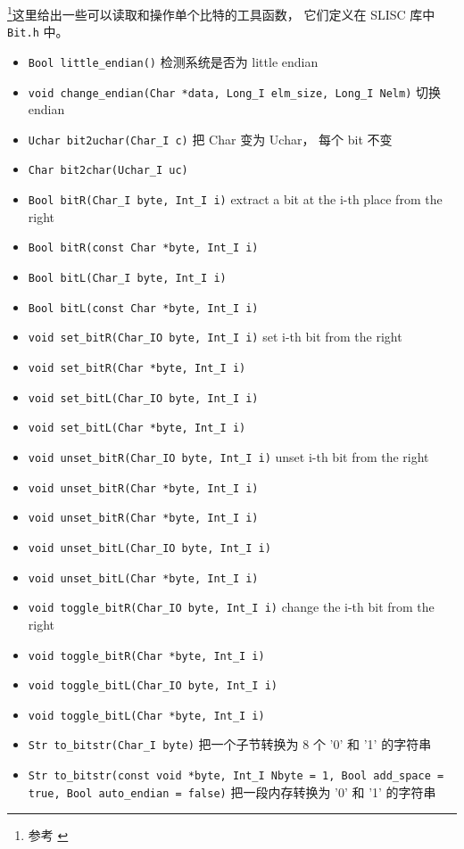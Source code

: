 
\footnote{参考 \cite{NR3}}这里给出一些可以读取和操作单个比特的工具函数， 它们定义在 SLISC 库中 \verb|Bit.h| 中。

\begin{itemize}
\item \verb|Bool little_endian()| 检测系统是否为 little endian
\item \verb|void change_endian(Char *data, Long_I elm_size, Long_I Nelm)| 切换 endian
\item \verb|Uchar bit2uchar(Char_I c)| 把 Char 变为 Uchar， 每个 bit 不变
\item \verb|Char bit2char(Uchar_I uc)|
\item \verb|Bool bitR(Char_I byte, Int_I i)| extract a bit at the i-th place from the right
\item \verb|Bool bitR(const Char *byte, Int_I i)|
\item \verb|Bool bitL(Char_I byte, Int_I i)|
\item \verb|Bool bitL(const Char *byte, Int_I i)|
\item \verb|void set_bitR(Char_IO byte, Int_I i)| set i-th bit from the right
\item \verb|void set_bitR(Char *byte, Int_I i)|
\item \verb|void set_bitL(Char_IO byte, Int_I i)|
\item \verb|void set_bitL(Char *byte, Int_I i)|
\item \verb|void unset_bitR(Char_IO byte, Int_I i)| unset i-th bit from the right
\item \verb|void unset_bitR(Char *byte, Int_I i)|
\item \verb|void unset_bitR(Char *byte, Int_I i)|
\item \verb|void unset_bitL(Char_IO byte, Int_I i)|
\item \verb|void unset_bitL(Char *byte, Int_I i)|
\item \verb|void toggle_bitR(Char_IO byte, Int_I i)| change the i-th bit from the right
\item \verb|void toggle_bitR(Char *byte, Int_I i)|
\item \verb|void toggle_bitL(Char_IO byte, Int_I i)|
\item \verb|void toggle_bitL(Char *byte, Int_I i)|
\item \verb|Str to_bitstr(Char_I byte)| 把一个子节转换为 8 个 '0' 和 '1' 的字符串
\item \verb|Str to_bitstr(const void *byte, Int_I Nbyte = 1, Bool add_space = true, Bool auto_endian = false)| 把一段内存转换为 '0' 和 '1' 的字符串

\end{itemize}
